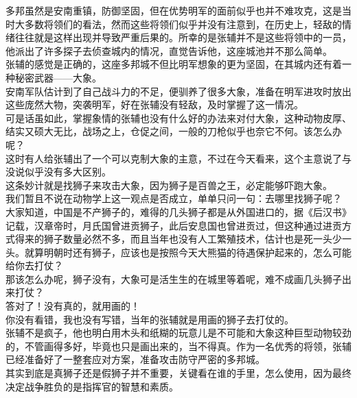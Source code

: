 \begin{multicols}{\theparacolNo}
多邦虽然是安南重镇，防御坚固，但在优势明军的面前似乎也并不难攻克，这是当时大多数将领们的看法，然而这些将领们似乎并没有注意到，在历史上，轻敌的情绪往往就是这样出现并导致严重后果的。所幸的是张辅并不是这些将领中的一员，他派出了许多探子去侦查城内的情况，直觉告诉他，这座城池并不那么简单。\\

张辅的感觉是正确的，这座多邦城不但比明军想象的更为坚固，在其城内还有着一种秘密武器——大象。\\

安南军队估计到了自己战斗力的不足，便驯养了很多大象，准备在明军进攻时放出这些庞然大物，突袭明军，好在张辅没有轻敌，及时掌握了这一情况。\\

可是话虽如此，掌握象情的张辅也没有什么好的办法来对付大象，这种动物皮厚、结实又硕大无比，战场之上，仓促之间，一般的刀枪似乎也奈它不何。该怎么办呢？\\

这时有人给张辅出了一个可以克制大象的主意，不过在今天看来，这个主意说了与没说似乎没有多大区别。\\

这条妙计就是找狮子来攻击大象，因为狮子是百兽之王，必定能够吓跑大象。\\

我们暂且不说在动物学上这一观点是否成立，单单只问一句：去哪里找狮子呢？\\

大家知道，中国是不产狮子的，难得的几头狮子都是从外国进口的，据《后汉书》记载，汉章帝时，月氏国曾进贡狮子，此后安息国也曾进贡过，但这种通过进贡方式得来的狮子数量必然不多，而且当年也没有人工繁殖技术，估计也是死一头少一头。就算明朝时还有狮子，应该也是按照今天大熊猫的待遇保护起来的，怎么可能给你去打仗？\\

那该怎么办呢，狮子没有，大象可是活生生的在城里等着呢，难不成画几头狮子出来打仗？\\

答对了！没有真的，就用画的！\\

你没有看错，我也没有写错，当年的张辅就是用画的狮子去打仗的。\\

张辅不是疯子，他也明白用木头和纸糊的玩意儿是不可能和大象这种巨型动物较劲的，不管画得多好，毕竟也只是画出来的，当不得真。作为一名优秀的将领，张辅已经准备好了一整套应对方案，准备攻击防守严密的多邦城。\\

其实到底是真狮子还是假狮子并不重要，关键看在谁的手里，怎么使用，因为最终决定战争胜负的是指挥官的智慧和素质。\\


\end{multicols}
